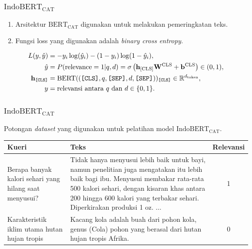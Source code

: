 \documentclass[10pt]{beamer}
\newcommand{\f}[1]{\textit{#1}}
\newcommand{\code}[1]{\texttt{#1}}
\begin{document}
\begin{frame}
    \frametitle{$\text{IndoBERT}_{\text{CAT}}$}
    \begin{enumerate}
        \item Arsitektur $\text{BERT}_\text{CAT}$ digunakan untuk melakukan pemeringkatan teks.
        \item Fungsi loss yang digunakan adalah \f{binary cross entropy}.
    \end{enumerate}

    \begin{align*}
        L(y, \hat{y}) &= - y_i \log(\hat{y}_i) - (1-y_i)\log(1-\hat{y}_i), \\
        \hat{y} &= P(\text{relevance} = 1 | q, d) = \sigma\left(  \mathbf{h}_{\text{[CLS]}} \mathbf{W}^{\text{CLS}}+\mathbf{b}^{\text{CLS}} \right) \in (0,1), \\
        \mathbf{h}_{\text{\code{[CLS]}}} &= \text{BERT}((\text{\code{[CLS]}}, q, \text{\code{[SEP]}}, d, \text{\code{[SEP]}}))_{\text{\code{[CLS]}}} \in \mathbb{R}^{d_{\text{token}}}, \\
        y &= \text{relevansi antara } q \text{ dan } d \in \{0, 1\}.
    \end{align*}

\end{frame}

\begin{frame}
    \frametitle{$\text{IndoBERT}_{\text{CAT}}$}
    Potongan \f{dataset} yang digunakan untuk pelatihan model $\text{IndoBERT}_{\text{CAT}}$.
    \begin{table}[!ht]
        \centering
        \small
        \begin{tabular}{|p{3cm}|p{4cm}|c|} \hline
            \textbf{Kueri}                                         & \textbf{Teks}                                                                                                                                                                                                                                                                                                                                                                                                                                                                                                                                                                                          & \textbf{Relevansi} \\ \hline
            Berapa banyak kalori sehari yang hilang saat menyusui? & Tidak hanya menyusui lebih baik untuk bayi, namun penelitian juga mengatakan itu lebih baik bagi ibu. Menyusui membakar rata-rata 500 kalori sehari, dengan kisaran khas antara 200 hingga 600 kalori yang terbakar sehari. Diperkirakan produksi 1 oz. $\dots$  & 1               \\ \hline
            Karakteristik iklim utama hutan hujan tropis           & Kacang kola adalah buah dari pohon kola, genus (Cola) pohon yang berasal dari hutan hujan tropis Afrika. & 0                  \\ \hline
        \end{tabular}
    \end{table}
    
\end{frame}
\end{document}
